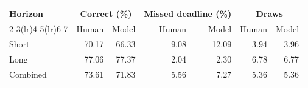 \begin{tabular}{lrrrrrr}
\toprule
Horizon & \multicolumn{2}{c}{Correct (\%)} & \multicolumn{2}{c}{Missed deadline (\%)} & \multicolumn{2}{c}{Draws} \\
\cmidrule(lr){2-3}\cmidrule(lr){4-5}\cmidrule(lr){6-7}
 & Human & Model & Human & Model & Human & Model \\
\midrule
Short & 70.17 & 66.33 & 9.08 & 12.09 & 3.94 & 3.96 \\
Long & 77.06 & 77.37 & 2.04 & 2.30 & 6.78 & 6.77 \\
Combined & 73.61 & 71.83 & 5.56 & 7.27 & 5.36 & 5.36 \\
\bottomrule
\end{tabular}
